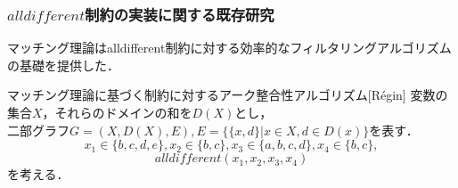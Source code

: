 \documentclass [dvipdfmx,11pt]{beamer}
\newcommand{\alldifferent}{$alldifferent$}
\begin{document}
\begin{frame}
    \frametitle{{\alldifferent}制約の実装に関する既存研究}
    マッチング理論はalldifferent制約に対する効率的なフィルタリングアルゴリズムの基礎を提供した．\\

    \begin{block}{マッチング理論に基づく{\alldiff}制約に対するアーク整合性アルゴリズム[Régin]}
        変数の集合$X$，それらのドメインの和を$D(X)$とし，\\
        二部グラフ$G = (X, D(X), E), E = \{\{x, d\} | x \in X, d \in D(x)\}$を表す．
        \[
            x_1 \in \{b, c, d, e\}, x_2 \in \{b, c\}, x_3 \in \{a, b, c, d\}, x_4 \in \{b, c\},
        \]
        \[
            alldifferent(x_1, x_2, x_3, x_4)
        \]
        を考える．
    \end{block}
\end{frame}
\end{document}
